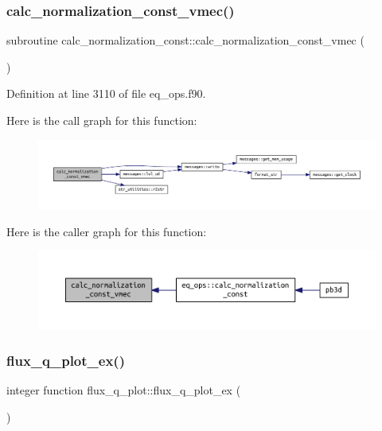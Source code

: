 \subsubsection{\texorpdfstring{calc\+\_\+normalization\+\_\+const\+\_\+vmec()}{calc\_normalization\_const\_vmec()}}
{\footnotesize\ttfamily subroutine calc\+\_\+normalization\+\_\+const\+::calc\+\_\+normalization\+\_\+const\+\_\+vmec (\begin{DoxyParamCaption}{ }\end{DoxyParamCaption})}



Definition at line 3110 of file eq\+\_\+ops.\+f90.

Here is the call graph for this function\+:
\nopagebreak
\begin{figure}[H]
\begin{center}
\leavevmode
\includegraphics[width=350pt]{eq__ops_8f90_a26984870bf6ddccfc7c55bdf5993a4d8_cgraph}
\end{center}
\end{figure}
Here is the caller graph for this function\+:
\nopagebreak
\begin{figure}[H]
\begin{center}
\leavevmode
\includegraphics[width=350pt]{eq__ops_8f90_a26984870bf6ddccfc7c55bdf5993a4d8_icgraph}
\end{center}
\end{figure}
\mbox{\label{eq__ops_8f90_aef1c3c58c42be2651bc2153d0a1ae5a9}} 
\subsubsection{\texorpdfstring{flux\+\_\+q\+\_\+plot\+\_\+ex()}{flux\_q\_plot\_ex()}}
{\footnotesize\ttfamily integer function flux\+\_\+q\+\_\+plot\+::flux\+\_\+q\+\_\+plot\+\_\+ex (\begin{DoxyParamCaption}{ }\end{DoxyParamCaption})}



